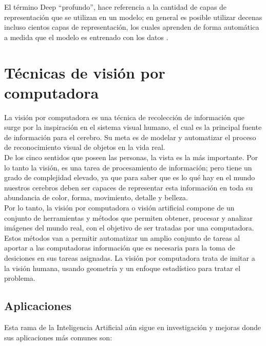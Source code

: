 El término Deep ``profundo'', hace referencia a la cantidad de capas de representación que se utilizan en un modelo; en general es posible utilizar decenas incluso cientos capas de representación, los cuales aprenden de forma automática a medida que el modelo es entrenado con los datos \cite{iaarbook:artificialvision}.

\section{Técnicas de visión por computadora}
La visión por computadora es una técnica de recolección de información que surge por la inspiración en el sistema visual humano, el cual es la principal fuente de información para el cerebro. Su meta es de modelar y automatizar el proceso de reconocimiento visual de objetos en la vida real.\\

De los cinco sentidos que poseen las personas, la vista es la más importante. Por lo tanto la visión, es una tarea de procesamiento de información; pero tiene un grado de complejidad elevado, ya que para saber que es lo qué hay en el mundo nuestros cerebros deben ser capaces de representar esta información en toda su abundancia de color, forma, movimiento, detalle y belleza. \cite{iaarbook:artificialvision}\\

Por lo tanto, la visión por computadora o visión artificial compone de un conjunto de herramientas y métodos que permiten obtener, procesar y analizar imágenes del mundo real, con el objetivo de ser tratadas por una computadora. Estos métodos van a permitir automatizar un amplio conjunto de tareas al aportar a las computadoras información que es necesaria para la toma de desiciones en sus tareas asignadas. La visión por computadora trata de imitar a la visión humana, usando geometría y un enfoque estadístico para tratar el problema.\\

\subsection{Aplicaciones}
Esta rama de la Inteligencia Artificial aún sigue en investigación y mejoras donde sus aplicaciones más comunes son:

